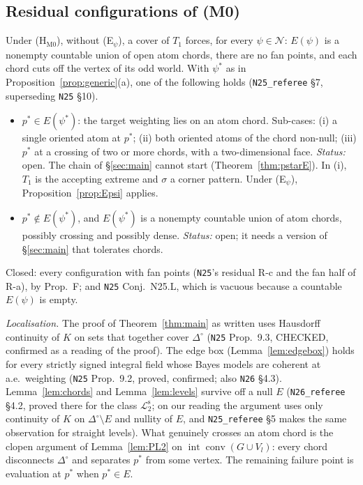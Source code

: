 \documentclass[11pt]{article}
\theoremstyle{definition}
\theoremstyle{remark}
\newcommand{\Di}{\Delta^{\circ}}
\newcommand{\co}{\operatorname{conv}}
\newcommand{\src}[1]{\texttt{#1}}
\newcommand{\Ltwo}{\mathcal L_2^{\mathrm s}}
\begin{document}
\subsection{Residual configurations of (M0)}\label{sec:M0-residual}
Under (H$_{\mathrm{M0}}$), without (E$_\psi$), a cover of $T_1$ forces, for every $\psi\in\mathcal N$: $E(\psi)$ is a nonempty countable union of open atom chords, there are no fan points, and each chord cuts off the vertex of its odd world. With $\psi^*$ as in Proposition~\ref{prop:generic}(a), one of the following holds (\src{N25\_referee} \S7, superseding \src{N25} \S10).
\begin{itemize}[leftmargin=*]
\item[\textbf{R-a$'$}] $p^*\in E(\psi^*)$: the target weighting lies on an atom chord. Sub-cases: (i) a single oriented atom at $p^*$; (ii) both oriented atoms of the chord non-null; (iii) $p^*$ at a crossing of two or more chords, with a two-dimensional face. \emph{Status:} open. The chain of \S\ref{sec:main} cannot start (Theorem~\ref{thm:pstarE}). In (i), $T_1$ is the accepting extreme and $\sigma$ a corner pattern. Under (E$_\psi$), Proposition~\ref{prop:Epsi} applies.
\item[\textbf{R-b$'$}] $p^*\notin E(\psi^*)$, and $E(\psi^*)$ is a nonempty countable union of atom chords, possibly crossing and possibly dense. \emph{Status:} open; it needs a version of \S\ref{sec:main} that tolerates chords.
\end{itemize}
Closed: every configuration with fan points (\src{N25}'s residual R-c and the fan half of R-a), by Prop.~F; and \src{N25} Conj.~N25.L, which is vacuous because a countable $E(\psi)$ is empty.

\emph{Localisation.} The proof of Theorem~\ref{thm:main} as written uses Hausdorff continuity of $K$ on sets that together cover $\Di$ (\src{N25} Prop.~9.3, CHECKED, confirmed as a reading of the proof). The edge box (Lemma~\ref{lem:edgebox}) holds for every strictly signed integral field whose Bayes models are coherent at a.e.\ weighting (\src{N25} Prop.~9.2, proved, confirmed; also \src{N26} \S4.3). Lemma~\ref{lem:chords} and Lemma~\ref{lem:levels} survive off a null $E$ (\src{N26\_referee} \S4.2, proved there for the class $\Ltwo$; on our reading the argument uses only continuity of $K$ on $\Di\setminus E$ and nullity of $E$, and \src{N25\_referee} \S5 makes the same observation for straight levels). What genuinely crosses an atom chord is the clopen argument of Lemma~\ref{lem:PL2} on $\operatorname{int}\co(G\cup V_l)$: every chord disconnects $\Di$ and separates $p^*$ from some vertex. The remaining failure point is evaluation at $p^*$ when $p^*\in E$.
\end{document}
